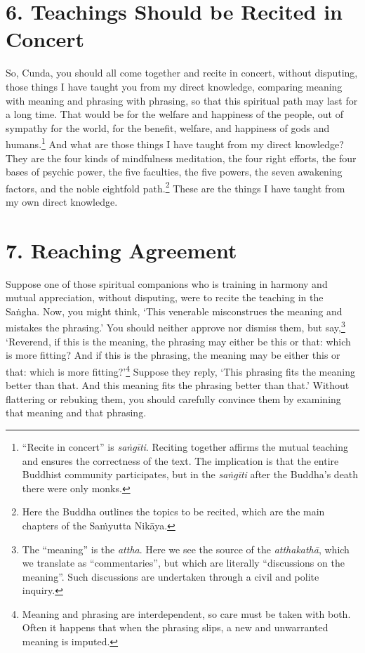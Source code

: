 \documentclass[12pt,openany]{book}%
\begin{document}
\section*{6. Teachings Should be Recited in Concert }

So, Cunda, you should all come together and recite in concert, without disputing, those things I have taught you from my direct knowledge, comparing meaning with meaning and phrasing with phrasing, so that this spiritual path may last for a long time. That would be for the welfare and happiness of the people, out of sympathy for the world, for the benefit, welfare, and happiness of gods and humans.\footnote{“Recite in concert” is \textit{\textsanskrit{saṅgīti}}. Reciting together affirms the mutual teaching and ensures the correctness of the text. The implication is that the entire Buddhist community participates, but in the \textit{\textsanskrit{saṅgīti}} after the Buddha’s death there were only monks. } And what are those things I have taught from my direct knowledge? They are the four kinds of mindfulness meditation, the four right efforts, the four bases of psychic power, the five faculties, the five powers, the seven awakening factors, and the noble eightfold path.\footnote{Here the Buddha outlines the topics to be recited, which are the main chapters of the \textsanskrit{Saṁyutta} \textsanskrit{Nikāya}. } These are the things I have taught from my own direct knowledge. 

\section*{7. Reaching Agreement }

Suppose one of those spiritual companions who is training in harmony and mutual appreciation, without disputing, were to recite the teaching in the \textsanskrit{Saṅgha}. Now, you might think, ‘This venerable misconstrues the meaning and mistakes the phrasing.’ You should neither approve nor dismiss them, but say,\footnote{The “meaning” is the \textit{attha}. Here we see the source of the \textit{\textsanskrit{atthakathā}}, which we translate as “commentaries”, but which are literally “discussions on the meaning”. Such discussions are undertaken through a civil and polite inquiry. } ‘Reverend, if this is the meaning, the phrasing may either be this or that: which is more fitting? And if this is the phrasing, the meaning may be either this or that: which is more fitting?’\footnote{Meaning and phrasing are interdependent, so care must be taken with both. Often it happens that when the phrasing slips, a new and unwarranted meaning is imputed. } Suppose they reply, ‘This phrasing fits the meaning better than that. And this meaning fits the phrasing better than that.’ Without flattering or rebuking them, you should carefully convince them by examining that meaning and that phrasing. 
\end{document}

